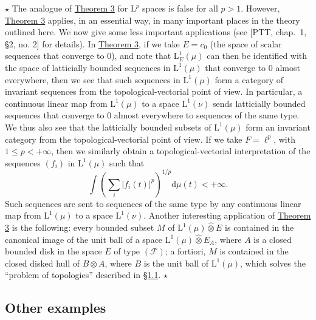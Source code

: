 \documentclass[british]{article}
\begin{document}
\(\star\) The analogue of \hyperref[section-1-theorem-3]{Theorem 3} for
\(\mathrm{L}^p\) spaces is false for all \(p>1\). However,
\hyperref[section-1-theorem-3]{Theorem 3} applies, in an essential way,
in many important places in the theory outlined here. We now give some
less important applications (see {[}PTT, chap.~1, §2, no. 2{]} for
details). In \hyperref[section-1-theorem-3]{Theorem 3}, if we take
\(E=c_0\) (the space of scalar sequences that converge to \(0\)), and
note that \(\mathrm{L}_E^1(\mu)\) can then be identified with the space
of latticially bounded sequences in \(\mathrm{L}^1(\mu)\) that converge
to \(0\) almost everywhere, then we see that such sequences in
\(\mathrm{L}^1(\mu)\) form a category of invariant sequences from the
topological-vectorial point of view. In particular, a continuous linear
map from \(\mathrm{L}^1(\mu)\) to a space \(\mathrm{L}^1(\nu)\) sends
latticially bounded sequences that converge to \(0\) almost everywhere
to sequences of the same type. We thus also see that the latticially
bounded subsets of \(\mathrm{L}^1(\mu)\) form an invariant category from
the topological-vectorial point of view. If we take \(F=\ell^p\), with
\(1\leqslant p<+\infty\), then we similarly obtain a
topological-vectorial interpretation of the sequences \((f_i)\) in
\(\mathrm{L}^1(\mu)\) such that \[
  \int \left(
    \sum_i |f_i(t)|^p
  \right)^{1/p}
  \mathrm{d}\mu(t) < +\infty.
\] Such sequences are sent to sequences of the same type by any
continuous linear map from \(\mathrm{L}^1(\mu)\) to a space
\(\mathrm{L}^1(\nu)\). Another interesting application of
\hyperref[section-1-theorem-3]{Theorem 3} is the following: every
bounded subset \(M\) of \(\mathrm{L}^1(\mu)\hat{\otimes}E\) is contained
in the canonical image of the unit ball of a space
\(\mathrm{L}^1(\mu)\hat{\otimes}E_A\), where \(A\) is a closed bounded
disk in the space \(E\) of type \((\mathscr{F})\); a fortiori, \(M\) is
contained in the closed disked hull of \(B\otimes A\), where \(B\) is
the unit ball of \(\mathrm{L}^1(\mu)\), which solves the ``problem of
topologies'' described in \hyperref[section-1.1]{§1.1}. \(\star\)

\subsection{Other examples}\label{section-1.4}
\end{document}
